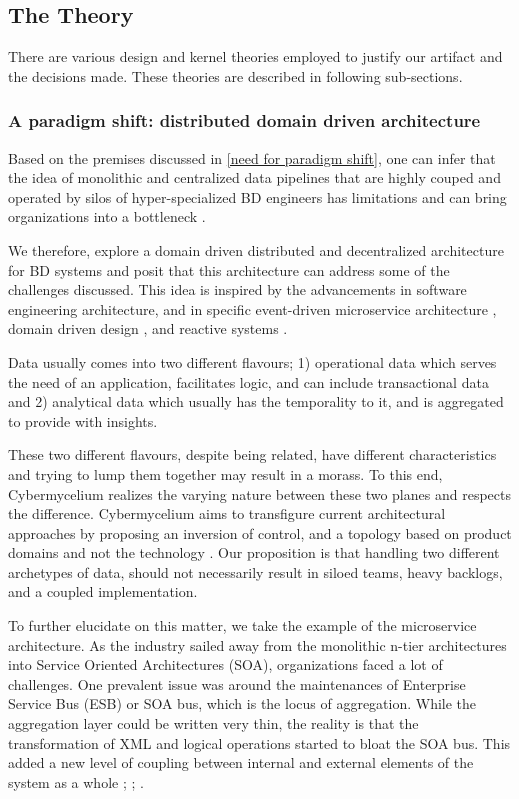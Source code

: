 \documentclass[review]{elsarticle}
\begin{document}
\subsection{The Theory}

There are various design and kernel theories employed to justify our artifact and the decisions made. These theories are described in following sub-sections.

\subsubsection{A paradigm shift: distributed domain driven architecture}

Based on the premises discussed in \ref{need for paradigm shift}, one can infer that the idea of monolithic and centralized data pipelines that are highly couped and operated by silos of hyper-specialized BD engineers has limitations and can bring organizations into a bottleneck .

We therefore, explore a domain driven distributed and decentralized architecture for BD systems and posit that this architecture can address some of the challenges discussed. This idea is inspired by the advancements in software engineering architecture, and in specific event-driven microservice architecture \cite{EventDrivenMicroServices}, domain driven design \cite{evans2004domain}, and reactive systems \cite{aceto2007reactive}.

Data usually comes into two different flavours; 1) operational data which serves the need of an application, facilitates logic, and can include transactional data and 2) analytical data which usually has the temporality to it, and is aggregated to provide with insights.

These two different flavours, despite being related, have different characteristics and trying to lump them together may result in a morass. To this end, Cybermycelium realizes the varying nature between these two planes and respects the difference. Cybermycelium aims to transfigure current architectural approaches by proposing an inversion of control, and a topology based on product domains and not the technology \cite{dataMeshArticle}. Our proposition is that handling two different archetypes of data, should not necessarily result in siloed teams, heavy backlogs, and a coupled implementation.

To further elucidate on this matter, we take the example of the microservice architecture. As the industry sailed away from the monolithic n-tier architectures into Service Oriented Architectures (SOA), organizations faced a lot of challenges. One prevalent issue was around the maintenances of Enterprise Service Bus (ESB) or SOA bus, which is the locus of aggregation. While the aggregation layer could be written very thin, the reality is that the transformation of XML and logical operations started to bloat the SOA bus. This added a new level of coupling between internal and external elements of the system as a whole \cite{di2017architecting}; \cite{zimmermann2017microservices}; \cite{waseem2020systematic}.
\end{document}
